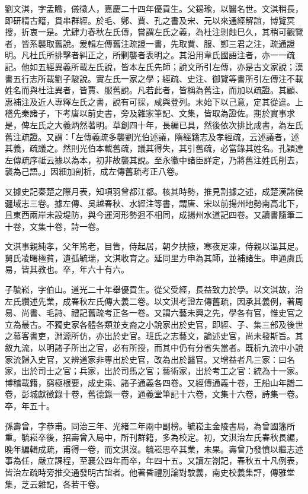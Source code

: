 \begin{pinyinscope}
劉文淇，字孟瞻，儀徵人，嘉慶二十四年優貢生。父錫瑜，以醫名世。文淇稍長，即研精古籍，貫串群經。於毛、鄭、賈、孔之書及宋、元以來通經解誼，博覽冥搜，折衷一是。尤肆力春秋左氏傳，嘗謂左氏之義，為杜注剝蝕巳久，其稍可觀覽者，皆系襲取舊說。爰輯左傳舊注疏證一書，先取賈、服、鄭三君之注，疏通證明。凡杜氏所排擊者糾正之，所剿襲者表明之。其沿用韋氏國語注者，亦一一疏記。他如五經異義所載左氏說，皆本左氏先師；說文所引左傳，亦是古文家說；漢書五行志所載劉子駿說。實左氏一家之學；經疏、史注、御覽等書所引左傳注不載姓名而與杜注異者，皆賈、服舊說。凡若此者，皆稱為舊注，而加以疏證。其顧、惠補注及近人專釋左氏之書，說有可採，咸與登列。末始下以己意，定其從違。上稽先秦諸子，下考唐以前史書，旁及雜家筆記、文集，皆取為證佐。期於實事求是，俾左氏之大義炳然著明。草創四十年，長編已具，然後依次排比成書，為左氏舊注疏證。又謂：「左傳義疏多襲劉光伯述議，隋經籍志及孝經疏，云述議者，述其義，疏議之。然則光伯本載舊疏，議其得失，其引舊疏，必當錄其姓名。孔穎達左傳疏序祗云據以為本，初非故襲其說。至永徽中諸臣詳定，乃將舊注姓氏削去，襲為己語。」因細加剖析，成左傳舊疏考正八卷。

又據史記秦楚之際月表，知項羽曾都江都。核其時勢，推見割據之述，成楚漢諸侯疆域志三卷。據左傳、吳越春秋、水經注等書，謂唐、宋以前揚州地勢南高北下，且東西兩岸未設堤防，與今運河形勢迥不相同，成揚州水道記四卷。又讀書隨筆二十卷，文集十卷，詩一卷。

文淇事親純孝，父年篤老，目眚，侍起居，朝夕扶掖，寒夜足凍，侍親以溫其足。舅氏凌曙極貧，遺孤毓瑞，文淇收育之。延同里方申為其師，並補諸生。申通虞氏易，皆其教也。卒，年六十有六。

子毓崧，字伯山。道光二十年舉優貢生。從父受經，長益致力於學。以文淇故，治左氏纘述先業，成春秋左氏傳大義二卷。以文淇考證左傳舊疏，因承其義例，著周易、尚書、毛詩、禮記舊疏考正各一卷。又謂六藝未興之先，學各有官，惟史官之立為最古。不獨史家各體各類並支裔之小說家出於史官，即經、子、集三部及後世之幕客書吏，淵源所仿，亦出於史官。班氏之志藝文，論述史官，尚未發斯旨。其敘九流，以明諸子所出之官，必有所授，而其中仍有分省失當者。既析九流中小說家流歸入史官，又辨道家非專出於史官，改為出於醫官。又增益者凡三家：曰名家，出於司士之官；兵家，出於司馬之官；藝術家，出於考工之官：統為十一家。博稽載籍，窮極根要，成史乘、諸子通義各四卷。又經傳通義十卷，王船山年譜二卷，彭城獻徵錄十卷，舊德錄一卷，通義堂筆記十六卷，文集十六卷，詩集一卷。卒，年五十。

孫壽曾，字恭甫。同治三年、光緒二年兩中副榜。毓崧主金陵書局，為曾國籓所重。毓崧卒後，招壽曾入局中，所刊群籍，多為校定。初，文淇治左氏春秋長編，晚年編輯成疏，甫得一卷，而文淇沒。毓崧思卒其業，未果。壽曾乃發憤以繼志述事為任，嚴立課程，至襄公四年而卒，年四十五。又讀左劄記，春秋五十凡例表，皆治左疏時旁推交通發明古誼者。他著昏禮別論對駮義，南史校義集評，傳雅堂集，芝云雜記，各若干卷。


\end{pinyinscope}
